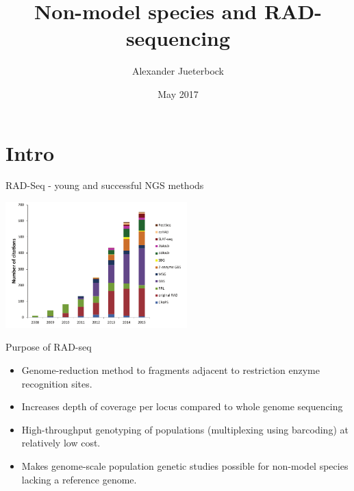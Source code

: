 \documentclass[presentation]{beamer}
\author{Alexander Jueterbock}
\date{May 2017}
\title{Non-model species and RAD-sequencing}
\begin{document}
\maketitle


\section{Intro}
\label{sec-1}
\begin{frame}[label=sec-1-0-1]{RAD-Seq - young and successful NGS methods}
\begin{center}


\includegraphics[width=7cm]{Andrews2016Sup1.png}

\tiny{\citep{Andrews2016}}
\end{center}
\end{frame}


\begin{frame}[label=sec-1-0-2]{Purpose of RAD-seq}
\begin{itemize}
\item Genome-reduction method to fragments adjacent to restriction enzyme
recognition sites.
\item Increases depth of coverage per locus compared to whole genome
sequencing
\item High-throughput genotyping of populations (multiplexing using
barcoding) at relatively low cost.
\item Makes genome-scale population genetic studies possible for non-model
species lacking a reference genome.
\end{itemize}
\end{frame}
\end{document}
